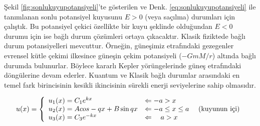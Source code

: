 \documentclass[a4paper,12pt, twoside]{article}
\begin{document}
Şekil \ref{fig:sonlukuyupotansiyeli}'te gösterilen ve Denk. \ref{eq:sonlukuyupotansiyeli} ile tanımlanan sonlu potansiyel kuyusunu $E>0$ (veya saçılma) durumları için çalıştık. Bu potansiyel çekici özellikte bir kuyu şeklinde olduğundan $E<0$ durumu için ise bağlı durum çözümleri ortaya çıkacaktır. Klasik fiziktede bağlı durum potansiyelleri mevcuttur. Örneğin, güneşimiz etrafındaki gezegenler evrensel kütle çekimi ilkesince güneşin çekim potansiyeli ($-G m M/r$) altında bağlı durumda bulunurlar. Böylece kararlı Kepler yörüngelerinde güneş etrafındaki döngülerine devam ederler. Kuantum ve Klasik bağlı durumlar arasındaki en temel fark birincisinin kesikli ikincisinin sürekli enerji seviyelerine sahip olmasıdır.

\begin{align}
u ( x )  = \left\{ 
\begin{array} { l l } 
{u_1(x) = C_1 e^{ k x} } & {\Leftarrow -a > x } \\
{u_2(x) = A cos -q x + B \sin q x } & {\Leftarrow -a \leq x \leq a } \quad \text{ (kuyunun içi)} \\
{u_3(x) = C_3 e^{- k x}} & {\Leftarrow \quad a > x }
\end{array} \right. 
\end{align}

\newpage
\renewcommand\refname{Kaynaklar}
{}
 
\end{document}
